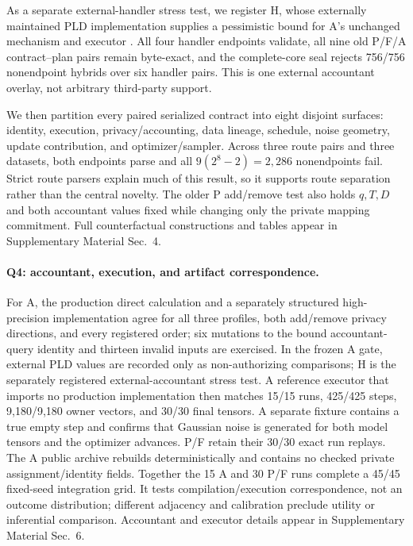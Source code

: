 \documentclass[letterpaper]{article}
\begin{document}
As a separate external-handler stress test, we register H, whose externally
maintained PLD implementation supplies a pessimistic bound for A's unchanged
mechanism and executor \citep{feldman2026efficientallocation}.  All four
handler endpoints validate, all nine old P/F/A contract--plan pairs remain
byte-exact,
and the complete-core seal rejects 756/756 nonendpoint hybrids over six
handler pairs.  This is one external accountant overlay, not arbitrary
third-party support.

We then partition every paired serialized contract into eight disjoint
surfaces: identity, execution, privacy/accounting, data lineage, schedule,
noise geometry, update contribution, and optimizer/sampler.  Across three
route pairs and three datasets, both endpoints parse and all
$9(2^8-2)=2{,}286$ nonendpoints fail.  Strict route parsers explain much of
this result, so it supports route separation rather than the central novelty.
The older P add/remove test also holds $q,T,D$ and both accountant values fixed
while changing only the private mapping commitment.
Full counterfactual constructions and tables appear in Supplementary Material
Sec.~4.

\paragraph{Q4: accountant, execution, and artifact correspondence.}
For A, the production direct calculation and a separately structured
high-precision implementation agree for all three profiles, both add/remove
privacy directions, and every registered order; six mutations to the bound
accountant-query identity and thirteen invalid inputs are exercised.  In the
frozen A gate, external PLD
values are recorded only as non-authorizing comparisons; H is the separately
registered external-accountant stress test.  A reference executor that imports
no production implementation then matches 15/15 runs, 425/425 steps,
9,180/9,180 owner vectors, and 30/30
final tensors.  A separate fixture contains a true empty step and confirms
that Gaussian noise is generated for both model tensors and the optimizer
advances.  P/F
retain their 30/30 exact run replays.  The A public archive rebuilds
deterministically and contains no checked private assignment/identity fields.
Together the 15 A and 30 P/F runs complete a 45/45 fixed-seed integration grid.
It tests compilation/execution correspondence, not an outcome distribution;
different adjacency and calibration preclude utility or inferential comparison.
Accountant and executor details appear in Supplementary Material Sec.~6.
\end{document}

